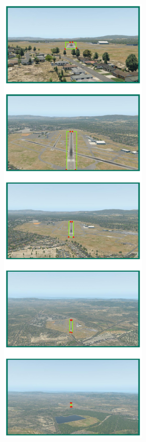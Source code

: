 \begin{figure}[p]
    \centering
    
    \begin{subfigure}[b]{0.48\textwidth}
        \centering
        \includegraphics[width=0.8\textwidth]{figures/bsv/rwd/rwd-successes.pdf}

\end{subfigure}
\end{figure}
